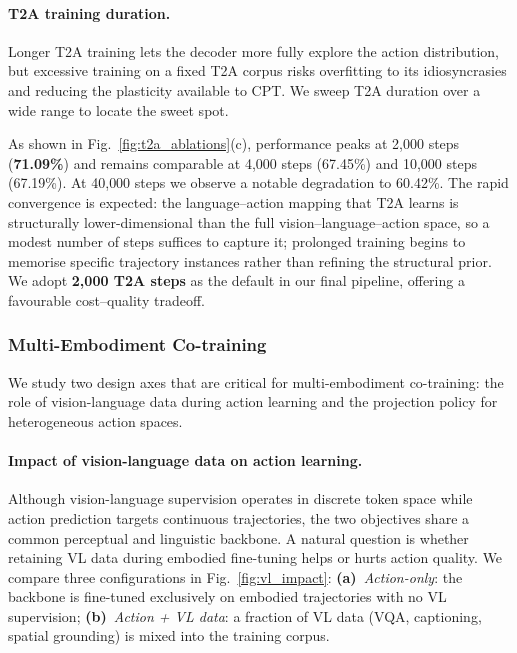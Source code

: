 \documentclass{llmxive}
\begin{document}
\paragraph{T2A training duration.}

Longer T2A training lets the decoder more fully explore the action
distribution, but excessive training on a fixed T2A corpus risks overfitting
to its idiosyncrasies and reducing the plasticity available to CPT.
We sweep T2A duration over a wide range to locate the sweet spot.

As shown in Fig.~\ref{fig:t2a_ablations}(c), performance peaks at
2{,}000 steps (\textbf{71.09\%}) and remains comparable at 4{,}000 steps
(67.45\%) and 10{,}000 steps (67.19\%).
At 40{,}000 steps we observe a notable degradation to 60.42\%.
The rapid convergence is expected: the language--action mapping that T2A
learns is structurally lower-dimensional than the full
vision--language--action space, so a modest number of steps suffices to
capture it; prolonged training begins to memorise specific trajectory
instances rather than refining the structural prior.
We adopt \textbf{2{,}000 T2A steps} as the default in our final pipeline,
offering a favourable cost--quality tradeoff.


 




\subsubsection{Multi-Embodiment Co-training}
\label{sec:ablation_cotrain}

We study two design axes that are critical for multi-embodiment co-training: the role of vision-language data during action learning and the projection policy for heterogeneous action spaces.


\paragraph{Impact of vision-language data on action learning.}
Although vision-language supervision operates in discrete token space
while action prediction targets continuous trajectories, the two
objectives share a common perceptual and linguistic backbone.
A natural question is whether retaining VL data during embodied
fine-tuning helps or hurts action quality.
We compare three configurations in Fig.~\ref{fig:vl_impact}:
\textbf{(a)}~\emph{Action-only}: the backbone is fine-tuned exclusively
on embodied trajectories with no VL supervision;
\textbf{(b)}~\emph{Action + VL data}: a fraction of VL data (VQA,
captioning, spatial grounding) is mixed into the training corpus.
\end{document}
